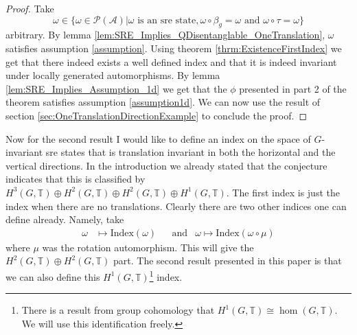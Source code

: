 \documentclass[12pt,a4paper,twoside]{article}
\newcommand{\PP}{\mathcal P}
\newcommand{\TT}{\mathbb T}
\renewcommand{\AA}{\mathcal A}
\theoremstyle{definition}
\numberwithin{equation}{section}
\begin{document}
\begin{proof}
	Take
	\begin{equation}
		\omega\in \{\omega\in\PP(\AA)|\omega\text{ is an sre state},\omega\circ\beta_g=\omega\text{ and }\omega\circ\tau=\omega\}
	\end{equation}
	arbitrary. By lemma \ref{lem:SRE_Implies_QDisentanglable_OneTranslation}, $\omega$ satisfies assumption \ref{assumption}. Using theorem \ref{thrm:ExistenceFirstIndex} we get that there indeed exists a well defined index and that it is indeed invariant under locally generated automorphisms. By lemma \ref{lem:SRE_Implies_Assumption_1d} we get that the $\phi$ presented in part 2 of the theorem satisfies assumption \ref{assumption1d}. We can now use the result of section \ref{sec:OneTranslationDirectionExample} to conclude the proof.
\end{proof}
Now for the second result I would like to define an index on the space of $G$-invariant sre states that is translation invariant in both the horizontal and the vertical directions. In the introduction we already stated that the conjecture indicates that this is classified by $H^3(G,\TT)\oplus H^2(G,\TT)\oplus H^2(G,\TT)\oplus H^1(G,\TT)$. The first index is just the index when there are no translations. Clearly there are two other indices one can define already. Namely, take
\begin{align}
	\omega&\mapsto \textrm{Index}(\omega)&&\text{and}&\omega\mapsto \textrm{Index}(\omega\circ\mu)
\end{align}
where $\mu$ was the rotation automorphism. This will give the $H^2(G,\TT)\oplus H^2(G,\TT)$ part. The second result presented in this paper is that we can also define this $H^1(G,\TT)$\footnote{There is a result from group cohomology that $H^1(G,\TT)\cong\hom(G,\TT)$. We will use this identification freely.} index.
\end{document}
